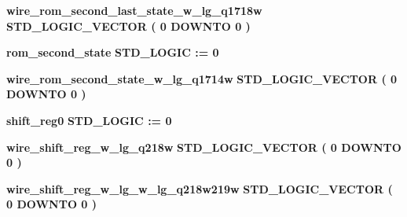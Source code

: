 \begin{DoxyCompactItemize}
\item 
{\bf wire\+\_\+rom\+\_\+second\+\_\+last\+\_\+state\+\_\+w\+\_\+lg\+\_\+q1718w} {\bfseries \textcolor{comment}{S\+T\+D\+\_\+\+L\+O\+G\+I\+C\+\_\+\+V\+E\+C\+T\+OR}\textcolor{vhdlchar}{ }\textcolor{vhdlchar}{(}\textcolor{vhdlchar}{ }\textcolor{vhdlchar}{ } \textcolor{vhdldigit}{0} \textcolor{vhdlchar}{ }\textcolor{keywordflow}{D\+O\+W\+N\+TO}\textcolor{vhdlchar}{ }\textcolor{vhdlchar}{ } \textcolor{vhdldigit}{0} \textcolor{vhdlchar}{ }\textcolor{vhdlchar}{)}\textcolor{vhdlchar}{ }} 
\item 
{\bf rom\+\_\+second\+\_\+state} {\bfseries \textcolor{comment}{S\+T\+D\+\_\+\+L\+O\+G\+IC}\textcolor{vhdlchar}{ }\textcolor{vhdlchar}{ }\textcolor{vhdlchar}{\+:}\textcolor{vhdlchar}{=}\textcolor{vhdlchar}{ }\textcolor{vhdlchar}{ }\textcolor{vhdlchar}{\textquotesingle{}}\textcolor{vhdlchar}{ } \textcolor{vhdldigit}{0} \textcolor{vhdlchar}{ }\textcolor{vhdlchar}{\textquotesingle{}}\textcolor{vhdlchar}{ }} 
\item 
{\bf wire\+\_\+rom\+\_\+second\+\_\+state\+\_\+w\+\_\+lg\+\_\+q1714w} {\bfseries \textcolor{comment}{S\+T\+D\+\_\+\+L\+O\+G\+I\+C\+\_\+\+V\+E\+C\+T\+OR}\textcolor{vhdlchar}{ }\textcolor{vhdlchar}{(}\textcolor{vhdlchar}{ }\textcolor{vhdlchar}{ } \textcolor{vhdldigit}{0} \textcolor{vhdlchar}{ }\textcolor{keywordflow}{D\+O\+W\+N\+TO}\textcolor{vhdlchar}{ }\textcolor{vhdlchar}{ } \textcolor{vhdldigit}{0} \textcolor{vhdlchar}{ }\textcolor{vhdlchar}{)}\textcolor{vhdlchar}{ }} 
\item 
{\bf shift\+\_\+reg0} {\bfseries \textcolor{comment}{S\+T\+D\+\_\+\+L\+O\+G\+IC}\textcolor{vhdlchar}{ }\textcolor{vhdlchar}{ }\textcolor{vhdlchar}{\+:}\textcolor{vhdlchar}{=}\textcolor{vhdlchar}{ }\textcolor{vhdlchar}{ }\textcolor{vhdlchar}{\textquotesingle{}}\textcolor{vhdlchar}{ } \textcolor{vhdldigit}{0} \textcolor{vhdlchar}{ }\textcolor{vhdlchar}{\textquotesingle{}}\textcolor{vhdlchar}{ }} 
\item 
{\bf wire\+\_\+shift\+\_\+reg\+\_\+w\+\_\+lg\+\_\+q218w} {\bfseries \textcolor{comment}{S\+T\+D\+\_\+\+L\+O\+G\+I\+C\+\_\+\+V\+E\+C\+T\+OR}\textcolor{vhdlchar}{ }\textcolor{vhdlchar}{(}\textcolor{vhdlchar}{ }\textcolor{vhdlchar}{ } \textcolor{vhdldigit}{0} \textcolor{vhdlchar}{ }\textcolor{keywordflow}{D\+O\+W\+N\+TO}\textcolor{vhdlchar}{ }\textcolor{vhdlchar}{ } \textcolor{vhdldigit}{0} \textcolor{vhdlchar}{ }\textcolor{vhdlchar}{)}\textcolor{vhdlchar}{ }} 
\item 
{\bf wire\+\_\+shift\+\_\+reg\+\_\+w\+\_\+lg\+\_\+w\+\_\+lg\+\_\+q218w219w} {\bfseries \textcolor{comment}{S\+T\+D\+\_\+\+L\+O\+G\+I\+C\+\_\+\+V\+E\+C\+T\+OR}\textcolor{vhdlchar}{ }\textcolor{vhdlchar}{(}\textcolor{vhdlchar}{ }\textcolor{vhdlchar}{ } \textcolor{vhdldigit}{0} \textcolor{vhdlchar}{ }\textcolor{keywordflow}{D\+O\+W\+N\+TO}\textcolor{vhdlchar}{ }\textcolor{vhdlchar}{ } \textcolor{vhdldigit}{0} \textcolor{vhdlchar}{ }\textcolor{vhdlchar}{)}\textcolor{vhdlchar}{ }} 

\end{DoxyCompactItemize}
